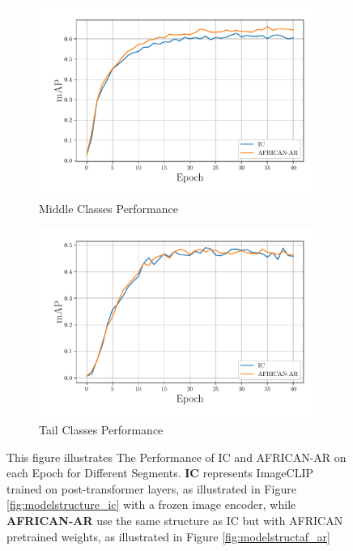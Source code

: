 \begin{figure}
\begin{adjustwidth}{-0.15\linewidth}{-0.07\linewidth}
    \vspace{10pt} %

    \begin{subfigure}[b]{0.65\textwidth}
        \includegraphics[width=\textwidth]{assets/charts/4_4_finalscore_2_middle}
        \caption{Middle Classes Performance}
        \label{fig:subfig3}
    \end{subfigure}
    \begin{subfigure}[b]{0.65\textwidth}
        \includegraphics[width=\textwidth]{assets/charts/4_4_finalscore_3_tail}
        \caption{Tail Classes Performance}
        \label{fig:subfig4}
    \end{subfigure}
    \caption[The Performance of IC and AFRICAN-AR on each Epoch for Different Segments]{This figure illustrates The Performance of IC and AFRICAN-AR on each Epoch for Different Segments. \textbf{IC} represents ImageCLIP trained on post-transformer layers, as illustrated in Figure \ref{fig:modelstructure_ic} with a frozen image encoder, while \textbf{AFRICAN-AR} use the same structure as IC but with AFRICAN pretrained weights, as illustrated in Figure \ref{fig:modelstructaf_ar}}
    \label{fig:final_result}
    
\end{adjustwidth}
\end{figure}



